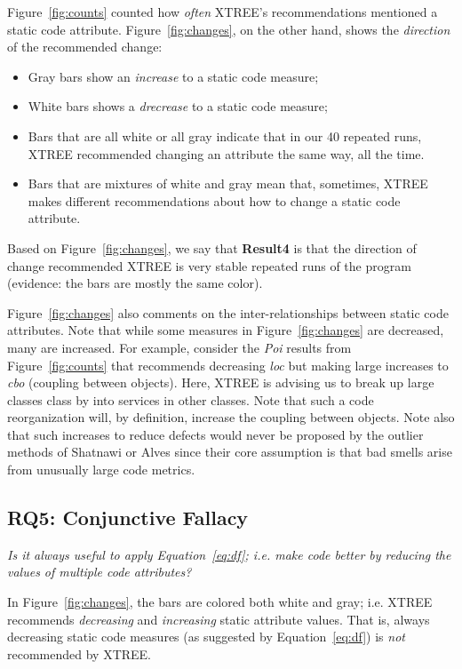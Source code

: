 \documentclass[twocolumn,5p]{elsarticle}
\newcommand{\bi}{\begin{itemize}[leftmargin=0.4cm]}
\newcommand{\ei}{\end{itemize}}
\newcommand{\fig}[1]{Figure~\ref{fig:#1}}
\newcommand{\eq}[1]{Equation~\ref{eq:#1}}
\theoremstyle{break}
\begin{document}
\begin{itemize}
		
		\fig{counts} counted how {\em often} XTREE's recommendations mentioned a static code attribute.
		\fig{changes}, on the other hand, shows the {\em direction} of the recommended change:
		\bi
		\item Gray bars show  an  {\em increase} to a static code measure;
		\item White bars shows a   {\em drecrease} to a static code measure;
		\item Bars that are all white or all gray indicate that in our 40 repeated runs, XTREE recommended changing an attribute the same way, all the time.
		\item Bars that are mixtures of white and gray mean that, sometimes, XTREE makes different recommendations about how to change a static
		code attribute.
		\ei
		Based on \fig{changes}, we say that {\bf Result4} is that the direction of change recommended  XTREE is  very stable repeated runs of the program  (evidence:
		the bars are mostly the same color).
		
		\fig{changes} also comments on the inter-relationships between static code attributes. Note that while some measures in
		\fig{changes} are decreased, many are increased.  
		For example, consider the {\em Poi} results
		from \fig{counts} that recommends decreasing {\em loc}
		but making large increases to {\em cbo} (coupling between
		objects). Here, XTREE is advising us to break up
		large classes class by into services
		in other classes. Note that such a code reorganization will, by
		definition, increase the coupling between objects. 
		Note also that such increases  to reduce
		defects would never be proposed by the outlier methods
		of Shatnawi or Alves since their core assumption is that bad
		smells arise from unusually large code metrics.
		
		\subsection{RQ5: Conjunctive Fallacy}
		
		{\em  Is  it  always  useful  to  apply \eq{df};  i.e.   make  code  better  by  reducing  the  values  of multiple code attributes?}
		
		In  \fig{changes}, the bars are colored both white and gray; i.e. XTREE recommends {\em decreasing} and {\em increasing} 
		static attribute values. That is, always decreasing static code measures (as suggested by \eq{df}) is {\em not} recommended by XTREE.
		

\end{itemize}
\end{document}
